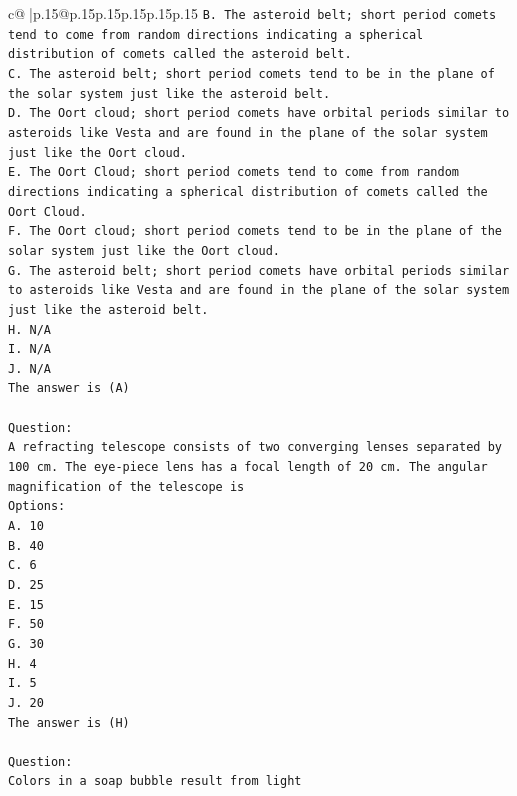 \documentclass{article}
\begin{document}
{\begin{supertabular}{c@{$\;$}|p{.15\linewidth}@{}p{.15\linewidth}p{.15\linewidth}p{.15\linewidth}p{.15\linewidth}p{.15\linewidth}}
{{{\texttt{B. The asteroid belt; short period comets tend to come from random directions indicating a spherical distribution of comets called the asteroid belt.} \\
\texttt{C. The asteroid belt; short period comets tend to be in the plane of the solar system just like the asteroid belt.} \\
\texttt{D. The Oort cloud; short period comets have orbital periods similar to asteroids like Vesta and are found in the plane of the solar system just like the Oort cloud.} \\
\texttt{E. The Oort Cloud; short period comets tend to come from random directions indicating a spherical distribution of comets called the Oort Cloud.} \\
\texttt{F. The Oort cloud; short period comets tend to be in the plane of the solar system just like the Oort cloud.} \\
\texttt{G. The asteroid belt; short period comets have orbital periods similar to asteroids like Vesta and are found in the plane of the solar system just like the asteroid belt.} \\
\texttt{H. N/A} \\
\texttt{I. N/A} \\
\texttt{J. N/A} \\
\texttt{The answer is (A)} \\
\\ 
\texttt{Question:} \\
\texttt{A refracting telescope consists of two converging lenses separated by 100 cm. The eye{-}piece lens has a focal length of 20 cm. The angular magnification of the telescope is} \\
\texttt{Options:} \\
\texttt{A. 10} \\
\texttt{B. 40} \\
\texttt{C. 6} \\
\texttt{D. 25} \\
\texttt{E. 15} \\
\texttt{F. 50} \\
\texttt{G. 30} \\
\texttt{H. 4} \\
\texttt{I. 5} \\
\texttt{J. 20} \\
\texttt{The answer is (H)} \\
\\ 
\texttt{Question:} \\
\texttt{Colors in a soap bubble result from light} \\
}}}
\end{supertabular}}
\end{document}
